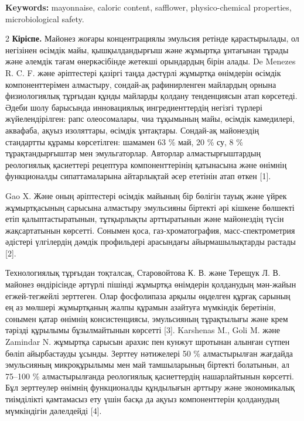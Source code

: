 {\bfseries Keywords:} mayonnaise, caloric content, safflower,
physico-chemical properties, microbiological safety.

\begin{multicols}{2}
{\bfseries Кіріспе.} Майонез жоғары концентрациялы эмульсия ретінде
қарастырылады, ол негізінен өсімдік майы, қышқылдандырғыш және жұмыртқа
ұнтағынан тұрады және әлемдік тағам өнеркәсібінде жетекші орындардың
бірін алады. De Menezes R. C. F. және әріптестері қазіргі таңда дәстүрлі
жұмыртқа өнімдерін өсімдік компоненттерімен алмастыру, сондай-ақ
рафинирленген майлардың орнына физиологиялық тұрғыдан құнды майларды
қолдану тенденциясын атап көрсетеді. Әдеби шолу барысында инновациялық
ингредиенттердің негізгі түрлері жүйелендірілген: рапс олеосомалары, чиа
тұқымының майы, өсімдік камедилері, аквафаба, ақуыз изоляттары, өсімдік
ұнтақтары. Сондай-ақ майонездің стандартты құрамы көрсетілген: шамамен
63 \% май, 20 \% су, 8 \% тұрақтандырғыштар мен эмульгаторлар. Авторлар
алмастырғыштардың реологиялық қасиеттері рецептура компоненттерінің
қатынасына және өнімнің функционалды сипаттамаларына айтарлықтай әсер
ететінін атап өткен {[}1{]}.

Gao X. Және оның әріптестері өсімдік майының бір бөлігін тауық және
үйрек жұмыртқасының сарысына алмастыру эмульсияны біртекті әрі кішкене
бөлшекті етіп қалыптастыратынын, тұтқырлықты арттыратынын және
майонездің түсін жақсартатынын көрсетті. Сонымен қоса,
газ-хроматография, масс-спектрометрия әдістері үлгілердің дәмдік
профильдері арасындағы айырмашылықтарды растады {[}2{]}.

Технологиялық тұрғыдан тоқталсақ, Старовойтова К. В. және Терещук Л. В.
майонез өндірісінде әртүрлі пішінді жұмыртқа өнімдерін қолданудың
мән-жайын егжей-тегжейлі зерттеген. Олар фосфолипаза арқылы өңделген
құрғақ сарының ең аз мөлшері жұмыртқаның жалпы құрамын азайтуға
мүмкіндік беретінін, сонымен қатар өнімнің консистенциясы, эмульсияның
тұрақтылығы және крем тәрізді құрылымы бұзылмайтынын көрсетті {[}3{]}.
Karshenas M., Goli M. және Zamindar N. жұмыртқа сарысын арахис пен
кунжут шротынан алынған сүтпен бөліп айырбастауды ұсынды. Зерттеу
нәтижелері 50 \% алмастырылған жағдайда эмульсияның микроқұрылымы мен
май тамшыларының біртекті болатынын, ал 75--100 \% алмастырылғанда
реологиялық қасиеттердің нашарлайтынын көрсетті. Бұл зерттеулер өнімнің
функционалды құндылығын арттыру және экономикалық тиімділікті қамтамасыз
ету үшін басқа да ақуыз компоненттерін қолданудың мүмкіндігін дәлелдейді
{[}4{]}.


\end{multicols}
